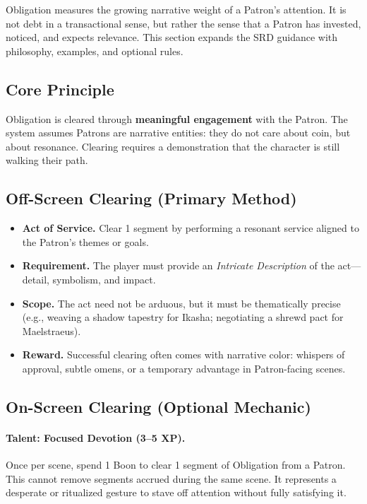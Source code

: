 Obligation measures the growing narrative weight of a Patron’s attention. It is not debt in a transactional sense, but rather the sense that a Patron has invested, noticed, and expects relevance. This section expands the SRD guidance with philosophy, examples, and optional rules.

\subsection{Core Principle}\label{subsec:obligation-principle}
Obligation is cleared through \textbf{meaningful engagement} with the Patron. The system assumes Patrons are narrative entities: they do not care about coin, but about resonance. Clearing requires a demonstration that the character is still walking their path.

\subsection{Off-Screen Clearing (Primary Method)}\label{subsec:obligation-offscreen}
\begin{itemize}
\item \textbf{Act of Service.} Clear 1 segment by performing a resonant service aligned to the Patron’s themes or goals.
\item \textbf{Requirement.} The player must provide an \emph{Intricate Description} of the act—detail, symbolism, and impact.
\item \textbf{Scope.} The act need not be arduous, but it must be thematically precise (e.g., weaving a shadow tapestry for Ikasha; negotiating a shrewd pact for Maelstraeus).
\item \textbf{Reward.} Successful clearing often comes with narrative color: whispers of approval, subtle omens, or a temporary advantage in Patron-facing scenes.
\end{itemize}

\subsection{On-Screen Clearing (Optional Mechanic)}\label{subsec:obligation-onscreen}
\paragraph{Talent: Focused Devotion (3–5 XP).} Once per scene, spend 1 Boon to clear 1 segment of Obligation from a Patron. This cannot remove segments accrued during the same scene. It represents a desperate or ritualized gesture to stave off attention without fully satisfying it.

